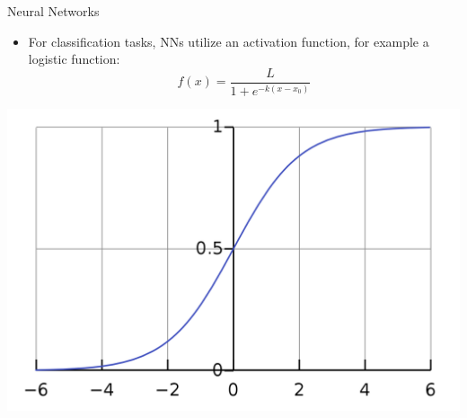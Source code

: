 \documentclass[aspectratio=1610, t]{beamer}\usepackage[]{graphicx}\usepackage[]{color}
\begin{document}
\begin{frame}[t]{Neural Networks}

\begin{itemize}
  \item For classification tasks, NNs utilize an activation function, for example a logistic function:
	$$f(x) = \frac{L}{1 + e^{-k(x - x_0)}}$$
  
\end{itemize}

\centering
\includegraphics[scale=0.17]{logistic.png}
        
\end{frame}
\end{document}
